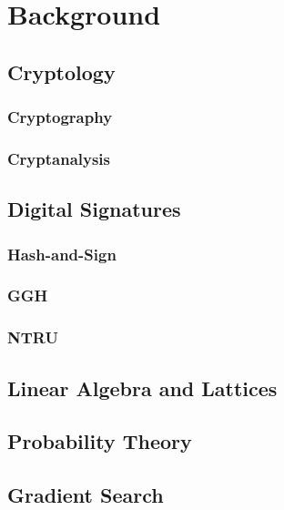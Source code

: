 \chapter{Background}

\section{Cryptology}
\subsection{Cryptography}
\subsection{Cryptanalysis}

\section{Digital Signatures}
\subsection{Hash-and-Sign}
\subsection{GGH}
\subsection{NTRU}

\section{Linear Algebra and Lattices}

\section{Probability Theory}
\section{Gradient Search}
